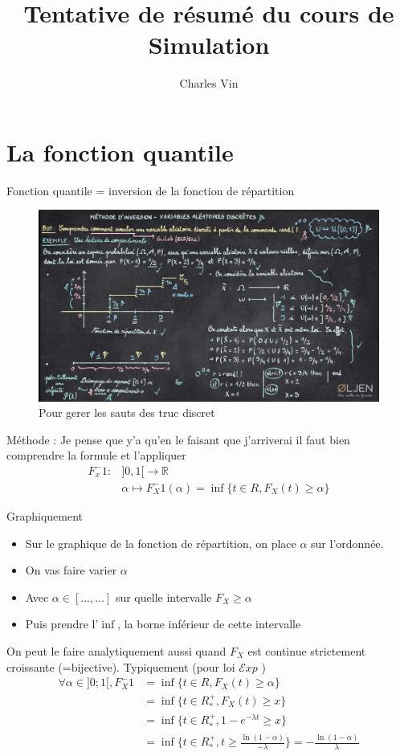 \documentclass{article}
\title{Tentative de résumé du cours de Simulation}
\author{Charles Vin}
\date{}
\begin{document}
\maketitle

\section{La fonction quantile}
Fonction quantile = inversion de la fonction de répartition
\begin{figure}[!htbp]
    \centering
    \includegraphics*[width=\textwidth]{fct_quantile.png}
    \caption{Pour gerer les sauts des truc discret}
\end{figure}

Méthode :
Je pense que y'a qu'en le faisant que j'arriverai il faut bien comprendre la formule et l'appliquer 
\begin{align*}
    F_x^-1 : &]0,1[ \longrightarrow \mathbb{R} \\ 
            & \alpha \mapsto F_X^-1(\alpha ) = \inf \{t \in R, F_X(t) \geq \alpha \}
\end{align*} 

Graphiquement
\begin{itemize}
    \item Sur le graphique de la fonction de répartition, on place $ \alpha $ sur l'ordonnée.
    \item On vas faire varier $ \alpha $ 
    \item Avec $ \alpha \in [..., ...] $ sur quelle intervalle $ F_X \geq \alpha  $ 
    \item Puis prendre l'$ \inf $, la borne inférieur de cette intervalle
\end{itemize}

On peut le faire analytiquement aussi quand $ F_X $ est continue strictement croissante (=bijective). Typiquement (pour loi $ \mathcal{E}xp $ )
\begin{align*}
    \forall \alpha \in ]0;1[, F_X^-1 &= \inf \{t \in R, F_X(t) \geq \alpha \} \\
            & = \inf \{t \in R^+_*, F_X(t) \geq x\} \\
            & = \inf \{t \in R^+_*, 1-e^{-\lambda t} \geq x\} \\
            & = \inf \{t \in R^+_*, t \geq \frac{\ln (1-\alpha  )}{-\lambda } \}  = -\frac{\ln (1-\alpha )}{\lambda }
\end{align*}
\end{document}
